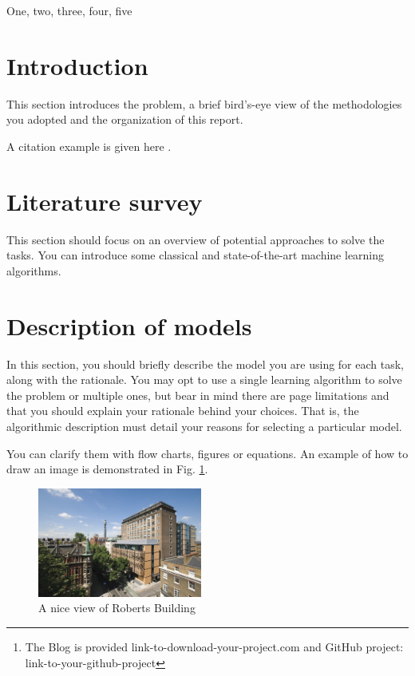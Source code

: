 \documentclass{article}
\title{}
\begin{document}
%
\maketitle
%
\begin{abstract}
    This section provides a brief overview of the methodology/results presented in the report.\footnote{The Blog is provided link-to-download-your-project.com and GitHub project: link-to-your-github-project}
\end{abstract}
%
\begin{keywords}
    One, two, three, four, five
\end{keywords}
%

\section{Introduction}
\label{sec:intro}
    This section introduces the problem, a brief bird's-eye view of the methodologies you adopted and the organization of this report.
    
    A citation example is given here \cite{C2}.


\section{Literature survey}
\label{sec:lite}
    This section should focus on an overview of potential approaches to solve the tasks. You can introduce some classical and state-of-the-art machine learning algorithms.


\section{Description of models}
\label{sec:models}
    In this section, you should briefly describe the model you are using for each task, along with the rationale. You may opt to use a single learning algorithm to solve the problem or multiple ones, but bear in mind there are page limitations and that you should explain your rationale behind your choices. That is, the algorithmic description must detail your reasons for selecting a particular model.
    
    You can clarify them with flow charts, figures or equations. An example of how to draw an image is demonstrated in Fig. \ref{fig:roberts_building}.
    
    \begin{figure}[htb]
    \centering
    \includegraphics[width=0.48\textwidth]{images/Roberts_building.jpg}
    \caption{A nice view of Roberts Building}
    \label{fig:roberts_building}
    \end{figure}
    
\end{document}
